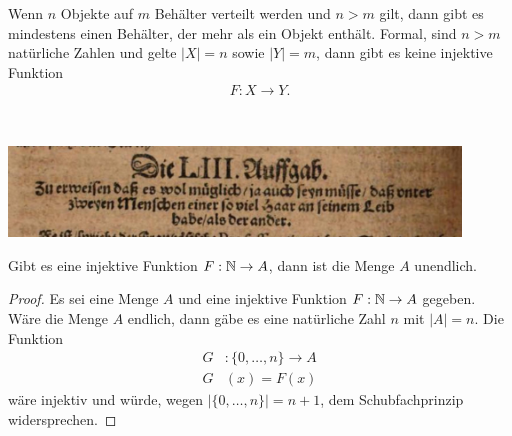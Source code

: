 \begin{lm}[Schubfachprinzip]
    Wenn $n$ Objekte auf $m$ Behälter verteilt werden und $n>m$ gilt, dann gibt es mindestens einen Behälter, der mehr als ein Objekt enthält. Formal, sind $n>m$ natürliche Zahlen und gelte $|X|= n$ sowie $|Y|=m$, dann gibt es keine injektive Funktion
    \begin{align*}
    F: X\to Y.
    \end{align*}
\end{lm}

\begin{ueb}~

    \includegraphics[width=0.9\textwidth]{figures/historicPigeon.png}
\end{ueb}
\begin{lsg}
\end{lsg}

\begin{lm}\label{injEndl}
    Gibt es eine injektive Funktion $F:\mathbb{N}\to A$, dann ist die Menge $A$ unendlich.
\end{lm}
\begin{proof}
    Es sei eine Menge $A$ und eine injektive Funktion $F:\mathbb{N}\to A$ gegeben. Wäre die Menge $A$ endlich, dann gäbe es eine natürliche Zahl $n$ mit $|A|=n$. Die Funktion
    \begin{align*}
    G&:\{0,\dots,n\}\to A\\
    G&(x) = F(x)
    \end{align*}
    wäre injektiv und würde, wegen $|\{0,\dots,n\}|=n+1$, dem Schubfachprinzip widersprechen.
\end{proof}

